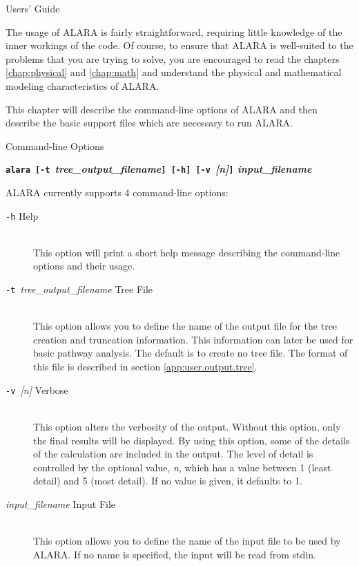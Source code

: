 
\begin{chapter}{Users' Guide\label{app:user.guide}}
  
  The usage of ALARA is fairly straightforward, requiring little
  knowledge of the inner workings of the code.  Of course, to ensure
  that ALARA is well-suited to the problems that you are trying to
  solve, you are encouraged to read the chapters \ref{chap:physical}
  and \ref{chap:math} and understand the physical and mathematical
  modeling characteristics of ALARA.
  
  This chapter will describe the command-line options of ALARA and
  then describe the basic support files which are necessary to run
  ALARA.
  
  \begin{section}{Command-line Options}\label{app:user.cmd}
    
    \begin{center}
      \textbf{\texttt{alara [-t }\textsl{tree\_output\_filename}\texttt{]
          [-h] [-v }\textsl{[n]}\texttt{]} \textsl{input\_filename}}
    \end{center}
    ALARA currently supports 4 command-line options:
    \begin{description}
    \item[\texttt{-h} Help]\ \\
      This option will print a short help message describing the
      command-line options and their usage.
    \item[\texttt{-t }\textsl{tree\_output\_filename} Tree File]\ \\
      This option allows you to define the name of the output file for the
      tree creation and truncation information.  This information can
      later be used for basic pathway analysis.  The default is to create
      no tree file.  The format of this file is described in section
      \ref{app:user.output.tree}.
    \item[\texttt{-v }\textsl{[n]} Verbose]\ \\
      This option alters the verbosity of the output.  Without this
      option, only the final results will be displayed.  By using this
      option, some of the details of the calculation are included in the
      output.  The level of detail is controlled by the optional value,
      \textsl{n}, which has a value between 1 (least detail) and 5 (most
      detail).  If no value is given, it defaults to 1.
    \item[\textsl{input\_filename} Input File]\ \\
      This option allows you to define the name of the input file to be
      used by ALARA.  If no name is specified, the input will be read from
      stdin.
    \end{description}
    

\end{section}
\end{chapter}
